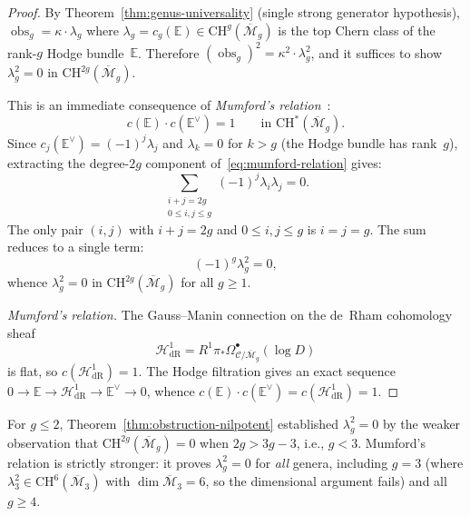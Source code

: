 \begin{proof}
By Theorem~\ref{thm:genus-universality} (single strong generator hypothesis),
$\operatorname{obs}_g = \kappa \cdot \lambda_g$ where
$\lambda_g = c_g(\mathbb{E}) \in \mathrm{CH}^g(\overline{\mathcal{M}}_g)$
is the top Chern class of the rank-$g$ Hodge bundle~$\mathbb{E}$.
Therefore $(\operatorname{obs}_g)^2 = \kappa^2 \cdot \lambda_g^2$,
and it suffices to show $\lambda_g^2 = 0$ in
$\mathrm{CH}^{2g}(\overline{\mathcal{M}}_g)$.

This is an immediate consequence of
\emph{Mumford's relation}~\cite{Mumford83}:
\begin{equation}\label{eq:mumford-relation}
c(\mathbb{E}) \cdot c(\mathbb{E}^\vee) = 1
\qquad \text{in } \mathrm{CH}^*(\overline{\mathcal{M}}_g).
\end{equation}
Since $c_j(\mathbb{E}^\vee) = (-1)^j \lambda_j$ and
$\lambda_k = 0$ for $k > g$ (the Hodge bundle has rank~$g$),
extracting the degree-$2g$ component
of~\eqref{eq:mumford-relation} gives:
\[
\sum_{\substack{i + j = 2g \\ 0 \leq i,j \leq g}}
(-1)^j \lambda_i \lambda_j = 0.
\]
The only pair $(i,j)$ with $i + j = 2g$ and $0 \leq i,j \leq g$
is $i = j = g$.  The sum reduces to a single term:
\[
(-1)^g \lambda_g^2 = 0,
\]
whence $\lambda_g^2 = 0$ in
$\mathrm{CH}^{2g}(\overline{\mathcal{M}}_g)$ for all $g \geq 1$.

\emph{Mumford's relation.}  The Gauss--Manin connection on the
de~Rham cohomology sheaf
\[
\mathcal{H}^1_{\mathrm{dR}}
= R^1\pi_*\Omega^{\bullet}_{\mathcal{C}/\overline{\mathcal{M}}_g}(\log D)
\]
is flat, so
$c(\mathcal{H}^1_{\mathrm{dR}}) = 1$.
The Hodge filtration gives an exact sequence
$0 \to \mathbb{E} \to \mathcal{H}^1_{\mathrm{dR}}
\to \mathbb{E}^\vee \to 0$, whence
$c(\mathbb{E}) \cdot c(\mathbb{E}^\vee)
= c(\mathcal{H}^1_{\mathrm{dR}}) = 1$.
\end{proof}

\begin{remark}
\label{rem:mumford-vs-dimension}
For $g \leq 2$, Theorem~\textup{\ref{thm:obstruction-nilpotent}}
established $\lambda_g^2 = 0$ by the weaker observation that
$\mathrm{CH}^{2g}(\overline{\mathcal{M}}_g) = 0$ when
$2g > 3g - 3$, i.e., $g < 3$.
Mumford's relation is strictly stronger: it proves
$\lambda_g^2 = 0$ for \emph{all} genera, including $g = 3$
(where $\lambda_3^2 \in \mathrm{CH}^6(\overline{\mathcal{M}}_3)$
with $\dim \overline{\mathcal{M}}_3 = 6$, so the dimensional
argument fails) and all $g \geq 4$.
\end{remark}

